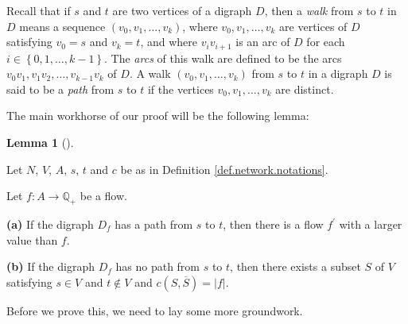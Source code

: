 \documentclass[numbers=enddot,12pt,final,onecolumn,notitlepage]{scrartcl}%
\theoremstyle{definition}
\newtheorem{lem}[theo]{Lemma}
\newenvironment{lemma}[1][]
{\begin{lem}[#1]\begin{leftbar}}
{\end{leftbar}\end{lem}}
\begin{document}
Recall that if $s$ and $t$ are two vertices of a digraph $D$, then a
\textit{walk} from $s$ to $t$ in $D$ means a sequence $\left(  v_{0}%
,v_{1},\ldots,v_{k}\right)  $, where $v_{0},v_{1},\ldots,v_{k}$ are vertices
of $D$ satisfying $v_{0}=s$ and $v_{k}=t$, and where $v_{i}v_{i+1}$ is an arc
of $D$ for each $i\in\left\{  0,1,\ldots,k-1\right\}  $. The \textit{arcs} of
this walk are defined to be the arcs $v_{0}v_{1},v_{1}v_{2},\ldots
,v_{k-1}v_{k}$ of $D$. A walk $\left(  v_{0},v_{1},\ldots,v_{k}\right)  $ from
$s$ to $t$ in a digraph $D$ is said to be a \textit{path} from $s$ to $t$ if
the vertices $v_{0},v_{1},\ldots,v_{k}$ are distinct.

The main workhorse of our proof will be the following lemma:

\begin{lemma}
\label{lem.4}Let $N$, $V$, $A$, $s$, $t$ and $c$ be as in Definition
\ref{def.network.notations}.

Let $f:A\rightarrow\mathbb{Q}_{+}$ be a flow.

\textbf{(a)} If the digraph $D_{f}$ has a path from $s$ to $t$, then there is
a flow $f^{\prime}$ with a larger value than $f$.

\textbf{(b)} If the digraph $D_{f}$ has no path from $s$ to $t$, then there
exists a subset $S$ of $V$ satisfying $s\in V$ and $t\notin V$ and $c\left(
S,\overline{S}\right)  =\left\vert f\right\vert $.
\end{lemma}

Before we prove this, we need to lay some more groundwork.
\end{document}
